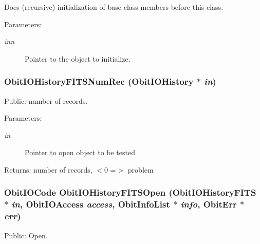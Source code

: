 Does (recursive) initialization of base class members before this class. \begin{Desc}
\item[Parameters:]
\begin{description}
\item[{\em inn}]Pointer to the object to initialize. \end{description}
\end{Desc}
\subsubsection{ Obit\-IOHistory\-FITSNum\-Rec ({\bf Obit\-IOHistory} $\ast$ {\em in})}\label{ObitIOHistoryFITS_8c_a17}


Public: number of records. 

\begin{Desc}
\item[Parameters:]
\begin{description}
\item[{\em in}]Pointer to open object to be tested \end{description}
\end{Desc}
\begin{Desc}
\item[Returns:]number of records, $<$0 =$>$ problem \end{Desc}
\subsubsection{\setlength{\rightskip}{0pt plus 5cm}Obit\-IOCode Obit\-IOHistory\-FITSOpen ({\bf Obit\-IOHistory\-FITS} $\ast$ {\em in}, Obit\-IOAccess {\em access}, {\bf Obit\-Info\-List} $\ast$ {\em info}, {\bf Obit\-Err} $\ast$ {\em err})}\label{ObitIOHistoryFITS_8c_a12}


Public: Open. 


